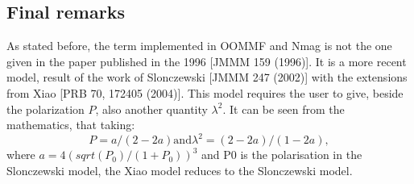 \documentclass[11pt,oneside,openany]{article}
\begin{document}
\subsection{Final remarks}
As stated before, the term implemented in OOMMF and Nmag is not the one
given in the paper published in the 1996 [JMMM 159 (1996)]. It is a more
recent model, result of the work of Slonczewski [JMMM 247 (2002)] with the
extensions from Xiao [PRB 70, 172405 (2004)]. This model requires the user
to give, beside the polarization $P$, also another quantity $\lambda^2$.
It can be seen from the mathematics, that taking:
$$
P = a/(2 - 2a) \mathrm{ and } \lambda^2 = (2 - 2a)/(1 - 2a),
$$
where $a = 4 (sqrt(P_0)/(1 + P_0))^3$ and P0 is the polarisation in the
Slonczewski model, the Xiao model reduces to the Slonczewski model.
\end{document}
